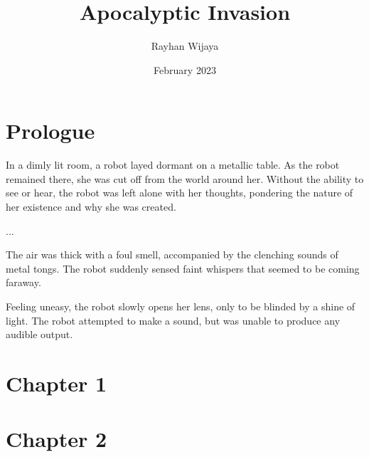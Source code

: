 \documentclass[12pt]{book}
\title{Apocalyptic Invasion}
\author{Rayhan Wijaya}
\date{February 2023}
\begin{document}
\maketitle

\section*{Prologue}

In a dimly lit room, a robot layed dormant on a metallic table. As the
robot remained there, she was cut off from the world around her.
Without the ability to see or hear, the robot was left alone with her
thoughts, pondering the nature of her existence and why she was
created.

...

The air was thick with a foul smell, accompanied by the clenching
sounds of metal tongs. The robot suddenly sensed faint whispers that
seemed to be coming faraway.

Feeling uneasy, the robot slowly opens her lens, only to be blinded by
a shine of light. The robot attempted to make a sound, but was unable
to produce any audible output.

\section*{Chapter 1}

\section*{Chapter 2}
\end{document}

